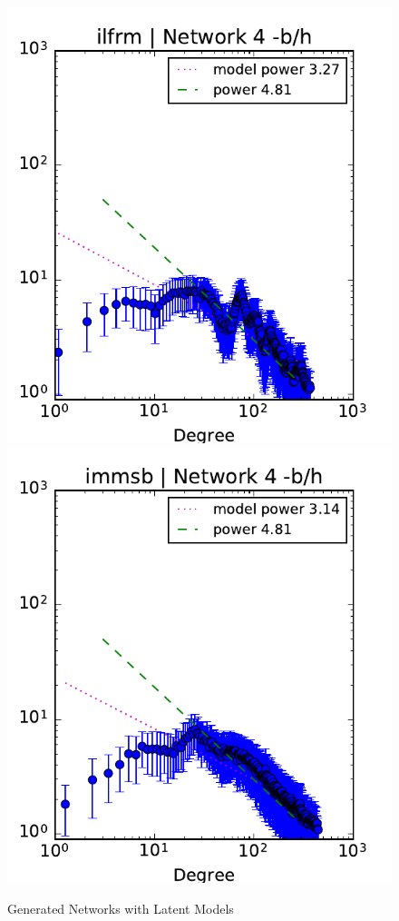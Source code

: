 \begin{figure}[h]
	\endminipage
	\vspace{-0.4cm}
	\includegraphics[scale=0.4]{img/ilfrm_g4_d}
	\endminipage
	\includegraphics[scale=0.4]{img/immsb_g4_d}
	\endminipage
	
	\caption{Generated Networks with Latent Models}
	\label{fig:gen_graph}
\end{figure}





